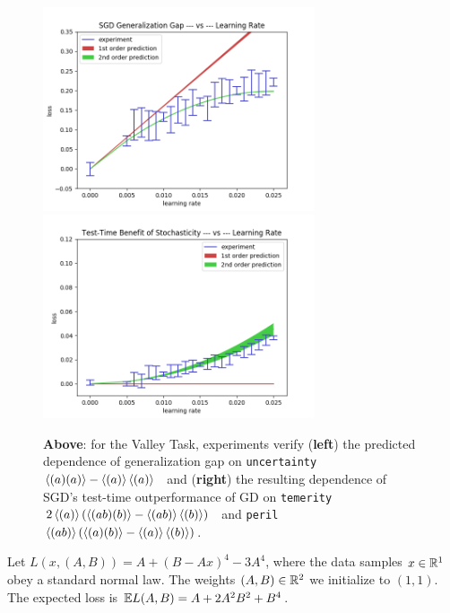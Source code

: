 \documentclass[12pt]{article}
\newcommand{\unc}{\texttt{uncertainty}~$\ang{(a)(a)}-\ang{(a)}\ang{(a)}$}
\newcommand{\tem}{\texttt{temerity}~$2\ang{(a)}(\ang{(ab)(b)}-\ang{(ab)}\ang{(b)})$}
\newcommand{\per}{\texttt{peril}~$\ang{(ab)}(\ang{(a)(b)}-\ang{(a)}\ang{(b)})$}
\begin{document}
            \begin{figure}[h]
                \includegraphics[width=8cm]{imgs/gauss.10/gen-sgd}
                \includegraphics[width=8cm]{imgs/gauss.10/out-diff}
                \caption*{
                    {\bf Above}: for the Valley Task, experiments verify
                        ({\bf left})  the predicted dependence of generalization gap on \unc~ and
                        ({\bf right}) the resulting dependence of SGD's test-time outperformance of GD on \tem~ and \per.  
                }
            \end{figure}


            Let $L(x, (A, B)) = A + (B - Ax)^4 - 3A^4$, where the data samples $x\in \mathbb{R}^1$ obey a standard normal law.   
            The weights $(A, B)\in \mathbb{R}^2$ we initialize to $(1, 1)$.
            The expected loss is $\mathbb{E} L(A, B) = A + 2A^2 B^2 + B^4$. 
\end{document}
